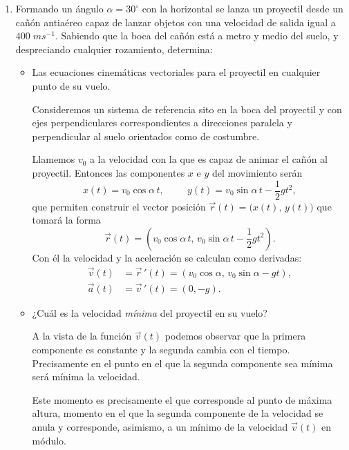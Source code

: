 \documentclass[a4paper,14pt]{extarticle}
\begin{document}
\begin{enumerate}
    \newpage
    
    \item Formando un ángulo $\alpha=30^\circ$ con la horizontal se lanza un proyectil desde un cañón antiaéreo capaz de lanzar objetos con una velocidad de salida igual a $400\;ms^{-1}$. Sabiendo que la boca del cañón está a metro y medio del suelo, y despreciando cualquier rozamiento, determina: 
    	\begin{itemize}
    		\item[a)] Las ecuaciones cinemáticas vectoriales para el proyectil en cualquier punto de su vuelo.
    		\begin{mdframed}[backgroundcolor=yellow!20]  
    		Consideremos un sistema de referencia sito en la boca del proyectil y con ejes perpendiculares correspondientes a direcciones paralela y perpendicular al suelo orientados como de costumbre.
    		
    			Llamemos $v_0$ a la velocidad con la que es capaz de animar el cañón al proyectil. Entonces las componentes $x$ e $y$ del movimiento serán
    		$$x(t)=v_0\cos\alpha\,t,\hspace{1cm} y(t)=v_0\sin\alpha\,t-\frac{1}{2}gt^2,$$
    		que permiten construir el vector posición $\vec{r}(t)=\big(x(t),\,y(t)\big)$ que tomará la forma
    		\[\vec{r}(t)=\left(v_0\cos\alpha\,t,\,v_0\sin\alpha\,t-\frac{1}{2}gt^2\right).\]
    		Con él la velocidad y la aceleración se calculan como derivadas:
    		\begin{align*}
    			\vec{v}(t)&=\vec{r}\,'(t)=\left(v_0\cos\alpha,\,v_0\sin\alpha-gt\right),\\
    			\vec{a}(t)&=\vec{v}\,'(t)=(0,-g).
    		\end{align*}
    		\end{mdframed}
    		\item[b)] ¿Cuál es la velocidad \textit{mínima} del proyectil en su vuelo?
    		\begin{mdframed}[backgroundcolor=yellow!20]  
    		A la vista de la función $\vec{v}(t)$ podemos observar que la primera componente es constante y la segunda cambia con el tiempo. Precisamente en el punto en el que la segunda componente sea mínima será mínima la velocidad. 
    		
    		Este momento es precisamente el que corresponde al punto de máxima altura, momento en el que la segunda componente de la velocidad se anula y corresponde, asimismo, a un mínimo de la velocidad $\vec{v}(t)$ en módulo.
    		\end{mdframed}
    		\newpage
    		

\end{itemize}
\end{enumerate}
\end{document}
